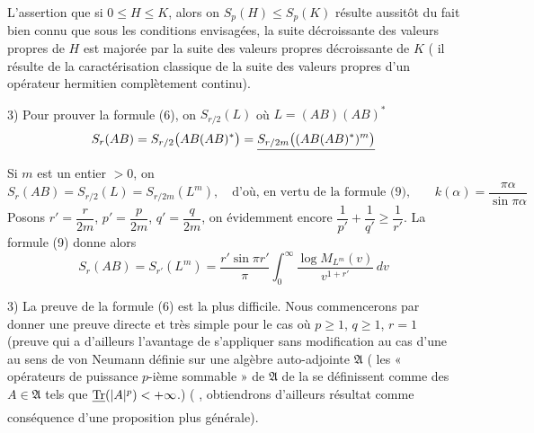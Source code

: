 \documentclass[11pt,a4paper]{article}
\begin{document}
L'assertion que si $0 \leq H \leq K$, \struck{\ill{}} alors on   $S_p(H) \leq S_p(K)$ résulte aussitôt du fait bien connu que sous les conditions envisagées, la suite décroissante  des valeurs propres de $H$ est majorée par la suite des valeurs propres décroissante de $K$ ( il résulte de la caractérisation  classique   de la suite des valeurs propres d'un opérateur hermitien complètement continu).


3) Pour prouver la formule (6), on \struck{\ill{}}  \struck{\ill{}}  $S_{r/2}(L)$ où $L = (AB)(AB)^*$ 
\[
  S_r(AB) = S_{r/2}\bigl(AB(AB)^*\bigr) = \struck{S_{r/2m}\bigl((AB(AB)^*)^m\bigr)}
\]
Si $m$ est un entier $> 0$, on  
\[
  S_r(AB) = S_{r/2}(L) = S_{r/2m}(L^m), \quad \text{d'où, en vertu de la formule (9),} \qquad k(\alpha) = \frac{\pi\alpha}{\sin \pi\alpha}
\]
 Posons $r' = \dfrac{r}{2m}$, $p' = \dfrac{p}{2m}$, $q' = \dfrac{q}{2m}$, on  évidemment encore $\dfrac{1}{p'} + \dfrac{1}{q'} \geq \dfrac{1}{r'}$. La formule (9) donne alors
\[
  S_r(AB) = S_{r'}(L^m) = \frac{r' \sin \pi r'}{\pi} \int_0^\infty \frac{\log M_{L^m}(v)}{v^{1+r'}}\, dv
\]

3) La preuve de la formule (6) est la plus difficile. Nous commencerons par donner une preuve directe et très simple pour le cas où $p \geq 1$, $q \geq 1$, $r = 1$  (preuve qui a d'ailleurs l'avantage de s'appliquer sans modification au cas d'une   au sens de von Neumann  définie sur une algèbre auto-adjointe $\mathfrak{A}$ \struck{\ill{}} \ill{}   ( les « \struck{\ill{}} opérateurs de puissance $p$-ième sommable » de $\mathfrak{A}$   de la  \ill{}  se définissent comme  des $A \in \mathfrak{A}$ tels que $\struck{\operatorname{Tr}}(|A|^p) < +\infty$.)  (  ,  obtiendrons d'ailleurs  résultat comme conséquence d'une proposition plus générale).
\end{document}
